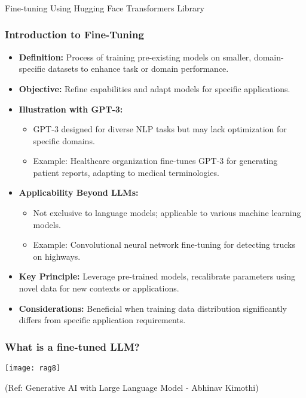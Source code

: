 \begin{frame}[fragile]\frametitle{}
\begin{center}
{\Large Fine-tuning Using Hugging Face Transformers Library}
\end{center}
\end{frame}

\begin{frame}[fragile]\frametitle{Introduction to Fine-Tuning}
  \begin{itemize}
    \item \textbf{Definition:} Process of training pre-existing models on smaller, domain-specific datasets to enhance task or domain performance.
    \item \textbf{Objective:} Refine capabilities and adapt models for specific applications.
    \item \textbf{Illustration with GPT-3:}
      \begin{itemize}
        \item GPT-3 designed for diverse NLP tasks but may lack optimization for specific domains.
        \item Example: Healthcare organization fine-tunes GPT-3 for generating patient reports, adapting to medical terminologies.
      \end{itemize}
    \item \textbf{Applicability Beyond LLMs:}
      \begin{itemize}
        \item Not exclusive to language models; applicable to various machine learning models.
        \item Example: Convolutional neural network fine-tuning for detecting trucks on highways.
      \end{itemize}
    \item \textbf{Key Principle:} Leverage pre-trained models, recalibrate parameters using novel data for new contexts or applications.
    \item \textbf{Considerations:} Beneficial when training data distribution significantly differs from specific application requirements.
  \end{itemize}
\end{frame}


\begin{frame}[fragile]\frametitle{What is a fine-tuned LLM?}


		\begin{center}
		\texttt{[image: rag8]}
		\end{center}

{\tiny (Ref: Generative AI with Large Language Model - Abhinav  Kimothi)}

\end{frame}



